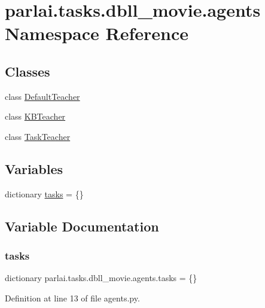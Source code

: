 \hypertarget{namespaceparlai_1_1tasks_1_1dbll__movie_1_1agents}{}\section{parlai.\+tasks.\+dbll\+\_\+movie.\+agents Namespace Reference}
\label{namespaceparlai_1_1tasks_1_1dbll__movie_1_1agents}
\subsection*{Classes}
\begin{DoxyCompactItemize}
\item 
class \hyperlink{classparlai_1_1tasks_1_1dbll__movie_1_1agents_1_1DefaultTeacher}{Default\+Teacher}
\item 
class \hyperlink{classparlai_1_1tasks_1_1dbll__movie_1_1agents_1_1KBTeacher}{K\+B\+Teacher}
\item 
class \hyperlink{classparlai_1_1tasks_1_1dbll__movie_1_1agents_1_1TaskTeacher}{Task\+Teacher}
\end{DoxyCompactItemize}
\subsection*{Variables}
\begin{DoxyCompactItemize}
\item 
dictionary \hyperlink{namespaceparlai_1_1tasks_1_1dbll__movie_1_1agents_a5e0551d7ded9d13465f6121663a99940}{tasks} = \{\}
\end{DoxyCompactItemize}


\subsection{Variable Documentation}
\mbox{\label{namespaceparlai_1_1tasks_1_1dbll__movie_1_1agents_a5e0551d7ded9d13465f6121663a99940}} 
\subsubsection{\texorpdfstring{tasks}{tasks}}
{\footnotesize\ttfamily dictionary parlai.\+tasks.\+dbll\+\_\+movie.\+agents.\+tasks = \{\}}



Definition at line 13 of file agents.\+py.

